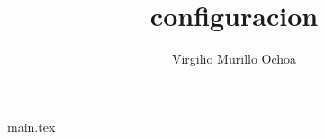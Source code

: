 \documentclass[17pt]{extarticle}
\title{configuracion}
\author{Virgilio Murillo Ochoa}
\begin{document}
{main.tex}
\end{document}

